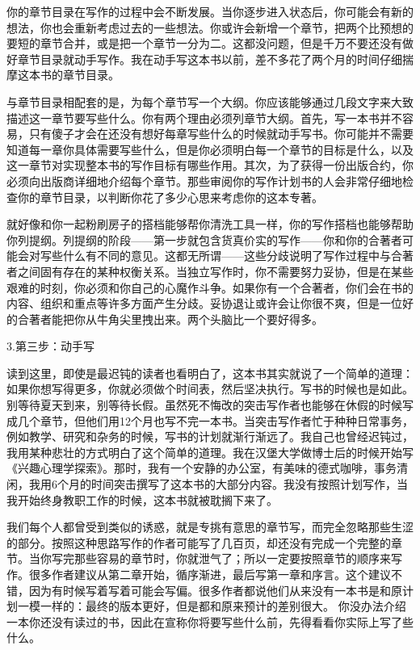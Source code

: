 你的章节目录在写作的过程中会不断发展。当你逐步进入状态后，你可能会有新的想法，你也会重新考虑过去的一些想法。你或许会新增一个章节，把两个比预想的要短的章节合并，或是把一个章节一分为二。这都没问题，但是千万不要还没有做好章节目录就动手写作。我在动手写这本书以前，差不多花了两个月的时间仔细揣摩这本书的章节目录。

与章节目录相配套的是，为每个章节写一个大纲。你应该能够通过几段文字来大致描述这一章节要写些什么。你有两个理由必须列章节大纲。首先，写一本书并不容易，只有傻子才会在还没有想好每章写些什么的时候就动手写书。你可能并不需要知道每一章你具体需要写些什么，但是你必须明白每一个章节的目标是什么，以及这一章节对实现整本书的写作目标有哪些作用。其次，为了获得一份出版合约，你必须向出版商详细地介绍每个章节。那些审阅你的写作计划书的人会非常仔细地检查你的章节目录，以判断你花了多少心思来考虑你的这本专著。

就好像和你一起粉刷房子的搭档能够帮你清洗工具一样，你的写作搭档也能够帮助你列提纲。列提纲的阶段——第一步就包含货真价实的写作——你和你的合著者可能会对写些什么有不同的意见。这都无所谓——这些分歧说明了写作过程中与合著者之间固有存在的某种权衡关系。当独立写作时，你不需要努力妥协，但是在某些艰难的时刻，你必须和你自己的心魔作斗争。如果你有一个合著者，你们会在书的内容、组织和重点等许多方面产生分歧。妥协退让或许会让你很不爽，但是一位好的合著者能把你从牛角尖里拽出来。两个头脑比一个要好得多。

{\kaishu 3.第三步：动手写}

读到这里，即使是最迟钝的读者也看明白了，这本书其实就说了一个简单的道理：如果你想写得更多，你就必须做个时间表，然后坚决执行。写书的时候也是如此。别等待夏天到来，别等待长假。虽然死不悔改的突击写作者也能够在休假的时候写成几个章节，但他们用12个月也写不完一本书。当突击写作者忙于种种日常事务，例如教学、研究和杂务的时候，写书的计划就渐行渐远了。我自己也曾经迟钝过，我用某种悲壮的方式明白了这个简单的道理。我在汉堡大学做博士后的时候开始写《兴趣心理学探索》。那时，我有一个安静的办公室，有美味的德式咖啡，事务清闲，我用6个月的时间突击撰写了这本书的大部分内容。我没有按照计划写作，当我开始终身教职工作的时候，这本书就被耽搁下来了。

我们每个人都曾受到类似的诱惑，就是专挑有意思的章节写，而完全忽略那些生涩的部分。按照这种思路写作的作者可能写了几百页，却还没有完成一个完整的章节。当你写完那些容易的章节时，你就泄气了；所以一定要按照章节的顺序来写作。很多作者建议从第二章开始，循序渐进，最后写第一章和序言。这个建议不错，因为有时候写着写着可能会写偏。很多作者都说他们从来没有一本书是和原计划一模一样的：最终的版本更好，但是都和原来预计的差别很大。 你没办法介绍一本你还没有读过的书，因此在宣称你将要写些什么前，先得看看你实际上写了些什么。

